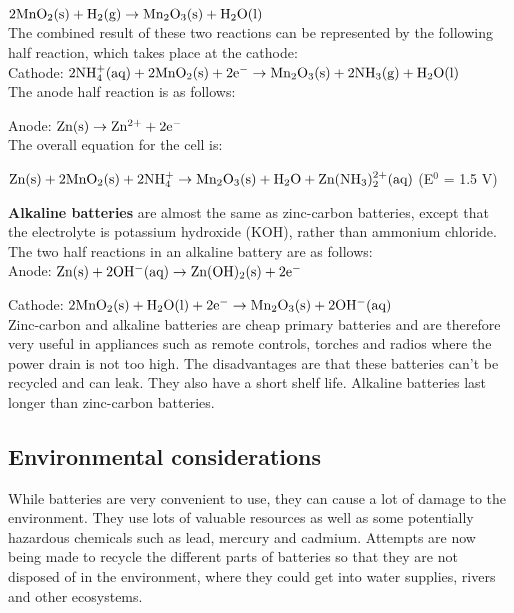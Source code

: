 $\rm{2MnO_{2}(s) + H_{2}(g) \rightarrow Mn_{2}O_{3}(s) + H_{2}O(l)}$\\

The combined result of these two reactions can be represented by the following half reaction, which takes place at the cathode:\\

Cathode: $\rm{2NH_{4}^{+}(aq) + 2MnO_{2}(s) + 2e^{-} \rightarrow Mn_{2}O_{3}(s) + 2NH_{3}(g) + H_{2}O(l)}$\\

The anode half reaction is as follows:

Anode: $\rm{Zn(s) \rightarrow Zn^{2+} + 2e^{-}}$\\

The overall equation for the cell is:

\begin{center}
$\rm{Zn(s) + 2MnO_{2}(s) + 2NH_{4}^{+} \rightarrow Mn_{2}O_{3}(s) + H_{2}O + Zn(NH_{3})_{2}^{2+}(aq)}$ (E$^{0}$ = 1.5 V)
\end{center}

\textbf{Alkaline batteries} are almost the same as zinc-carbon batteries, except that the electrolyte is potassium hydroxide (KOH), rather than ammonium chloride. The two half reactions in an alkaline battery are as follows:\\

Anode: $\rm{Zn(s) + 2OH^{-}(aq) \rightarrow Zn(OH)_{2}(s) + 2e^{-}}$

Cathode: $\rm{2MnO_{2}(s) + H_{2}O(l) + 2e^{-} \rightarrow Mn_{2}O_{3}(s) + 2OH^{-}(aq)}$\\


Zinc-carbon and alkaline batteries are cheap primary batteries and are therefore very useful in appliances such as remote controls, torches and radios where the power drain is not too high. The disadvantages are that these batteries can't be recycled and can leak. They also have a short shelf life. Alkaline batteries last longer than zinc-carbon batteries.


\subsection{Environmental considerations}

While batteries are very convenient to use, they can cause a lot of damage to the environment. They use lots of valuable resources as well as some potentially hazardous chemicals such as lead, mercury and cadmium. Attempts are now being made to recycle the different parts of batteries so that they are not disposed of in the environment, where they could get into water supplies, rivers and other ecosystems.

